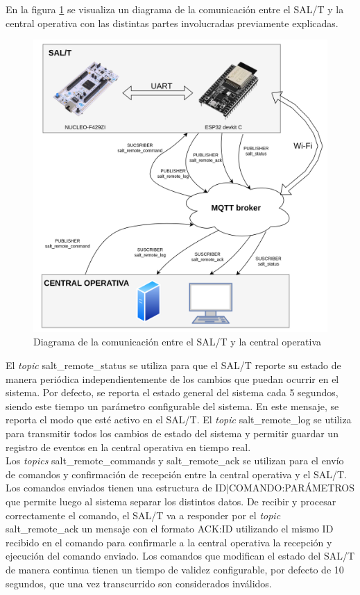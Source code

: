 En la figura \ref{fig:mqtt_bloque} se visualiza un diagrama de la comunicación entre el SAL/T y la central operativa con las distintas partes involucradas previamente explicadas. 

\begin{figure}[H]
    \centering
    \includegraphics[width = \linewidth]{img/mqtt_bloques.png}    
    \caption{Diagrama de la comunicación entre el SAL/T y la central operativa}
    \label{fig:mqtt_bloque}
\end{figure}    




El \textit{topic} salt\_remote\_status se utiliza para que el SAL/T reporte su estado de manera periódica independientemente de los cambios que puedan ocurrir en el sistema. Por defecto, se reporta el estado general del sistema cada 5 segundos, siendo este tiempo un parámetro configurable del sistema. En este mensaje, se reporta el modo que esté activo en el SAL/T. El \textit{topic} salt\_remote\_log se utiliza para transmitir todos los cambios de estado del sistema y permitir guardar un registro de eventos en la central operativa en tiempo real. \\


Los \textit{topics} salt\_remote\_commands y salt\_remote\_ack se utilizan para el envío de comandos y confirmación de recepción entre la central operativa y el SAL/T. Los comandos enviados tienen una estructura de ID|COMANDO:PARÁMETROS que permite luego al sistema separar los distintos datos. De recibir y procesar correctamente el comando, el SAL/T va a responder por el \textit{topic} salt\_remote\_ack un mensaje con el formato ACK:ID utilizando el mismo ID recibido en el comando para confirmarle a la central operativa la recepción y ejecución del comando enviado. Los comandos que modifican el estado del SAL/T de manera continua tienen un tiempo de validez configurable, por defecto de 10 segundos, que una vez transcurrido son considerados inválidos. \\ 



